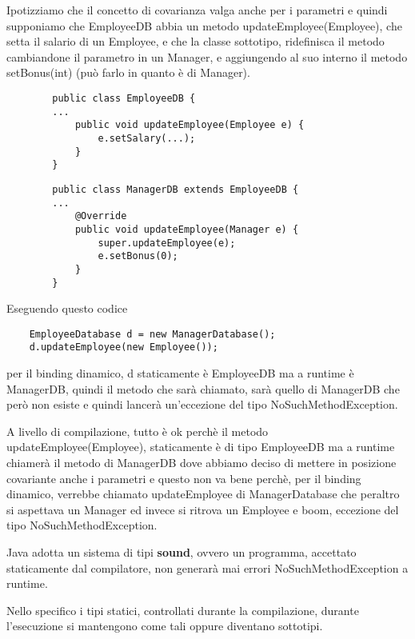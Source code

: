 Ipotizziamo che il concetto di covarianza valga anche per i parametri e quindi supponiamo che EmployeeDB abbia un metodo updateEmployee(Employee), che setta il salario di un Employee, e che la classe sottotipo, ridefinisca il metodo cambiandone il parametro in un Manager,  e aggiungendo al suo interno il metodo setBonus(int) (può farlo in quanto è di Manager).

\begin{multicols}{2}
    \begin{lstlisting}
        public class EmployeeDB {
        ...
            public void updateEmployee(Employee e) {
                e.setSalary(...);
            }
        }
    \end{lstlisting}    
    \columnbreak
    \begin{lstlisting}
        public class ManagerDB extends EmployeeDB {
        ...
            @Override
            public void updateEmployee(Manager e) {
                super.updateEmployee(e);
                e.setBonus(0);
            }
        }
    \end{lstlisting}
\end{multicols}

Eseguendo questo codice

\begin{lstlisting}
    EmployeeDatabase d = new ManagerDatabase();
    d.updateEmployee(new Employee());
\end{lstlisting}

per il binding dinamico, d staticamente è EmployeeDB ma a runtime è ManagerDB, quindi il metodo che sarà chiamato, sarà quello di ManagerDB che 
però non esiste e quindi lancerà un'eccezione del tipo NoSuchMethodException.

A livello di compilazione, tutto è ok perchè il metodo updateEmployee(Employee), staticamente è di tipo \newline EmployeeDB ma a runtime chiamerà il metodo di ManagerDB 
dove abbiamo deciso di mettere in posizione covariante anche i parametri e questo non va bene perchè, per il binding dinamico, verrebbe chiamato updateEmployee
di ManagerDatabase che peraltro si aspettava un Manager ed invece si ritrova un Employee e boom, eccezione del tipo NoSuchMethodException.

Java adotta un sistema di tipi \textbf{sound}, ovvero un programma, accettato staticamente dal compilatore, non generarà mai errori NoSuchMethodException a runtime.

Nello specifico i tipi statici, controllati durante la compilazione, durante l’esecuzione si mantengono come tali oppure diventano sottotipi.

